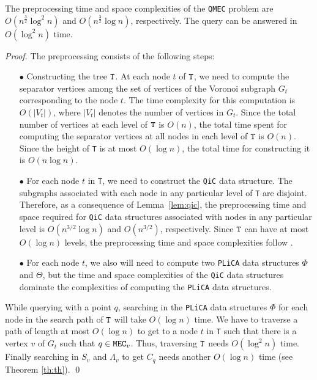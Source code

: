 \documentclass[12pt]{llncs}
\begin{document}
\begin{lemma} \label{xxz}
The preprocessing time and space complexities of the {\tt QMEC} problem are  
$O(n^{\frac{3}{2}} \log^2 n)$ and  $O(n^{\frac{3}{2}} \log n)$,
respectively. The query can be answered in $O(\log^2n)$ time.
\end{lemma}
\begin{proof}
The preprocessing consists of the following steps:
\begin{itemize}
\item[$\bullet$] Constructing the tree $\tt T$. At each node $t$ of 
$\tt T$, we need to compute the separator vertices among the set of 
vertices of the Voronoi subgraph $G_t$ corresponding to the node $t$. 
The time complexity for this computation is $O(|V_t|)$, where $|V_t|$ 
denotes the number of vertices in $G_t$. Since the total number of 
vertices at each level of $\tt T$ is $O(n)$, the total time spent for 
computing the separator vertices at all nodes in each level of $\tt T$ 
is $O(n)$.  Since the height of {\tt T} is at most $O(\log n)$,  
the total time for constructing it is $O(n\log n)$.
\item[$\bullet$]  For each node $t$ in {\tt T}, we need to construct the {\tt QiC} data structure. The subgraphs associated with each node in any particular level of {\tt T} are disjoint. Therefore, as a consequence of Lemma\ \ref{lem:qic}, the preprocessing time and space required for {\tt QiC} data structures associated with nodes in any particular level is $O(n^{3/2} \log n)$ and $O(n^{3/2})$, respectively. Since $\tt T$ can have at most 
$O(\log n)$ levels, the preprocessing time and space complexities follow .
\item[$\bullet$] For each node $t$, we also will need to compute two  {\tt PLiCA} data structures $\Phi$ and $\Theta$, but the time and space complexities of the {\tt QiC} data structures dominate the complexities of computing the {\tt PLiCA} data structures.
\end{itemize}

While querying with a point $q$,  searching in the {\tt PLiCA} data 
structures $\Phi$ for each node  in the search path of ${\tt T}$  will take $O(\log n)$ time. We  have 
to traverse a path of length at most $O(\log n)$ to get to a node $t$ in {\tt T} such that  there is a vertex $v$ of 
$G_t$ such that $q\in {\tt MEC}_v$. Thus, traversing $\tt T$ needs 
$O(\log^2n)$ time. Finally searching in $S_v$ and $\Lambda_v$ to get $C_q$ needs another 
$O(\log n)$ time (see Theorem \ref{th:th}). 
\qed
\end{proof}
\end{document}
